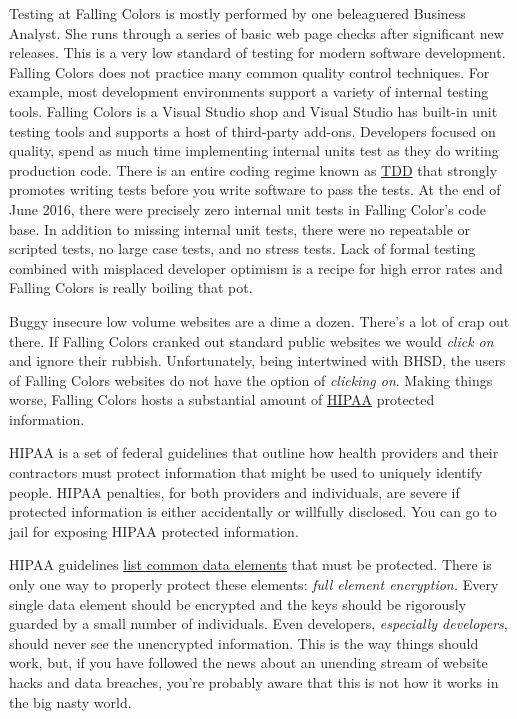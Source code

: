 Testing at Falling Colors is mostly performed by one beleaguered
Business Analyst. She runs through a series of basic web page checks
after significant new releases. This is a very low standard of testing
for modern software development. Falling Colors does not practice many
common quality control techniques. For example, most development
environments support a variety of internal testing tools. Falling Colors
is a Visual Studio shop and Visual Studio has built-in unit testing
tools and supports a host of third-party add-ons. Developers focused on
quality, spend as much time implementing internal units test as they do
writing production code. There is an entire coding regime known as
\href{http://agiledata.org/essays/tdd.html}{TDD} that strongly promotes
writing tests before you write software to pass the tests. At the end of
June 2016, there were precisely zero internal unit tests in Falling
Color's code base. In addition to missing internal unit tests, there
were no repeatable or scripted tests, no large case tests, and no stress
tests. Lack of formal testing combined with misplaced developer optimism
is a recipe for high error rates and Falling Colors is really boiling
that pot.

Buggy insecure low volume websites are a dime a dozen. There's a lot of
crap out there. If Falling Colors cranked out standard public websites
we would \emph{click on} and ignore their rubbish. Unfortunately, being
intertwined with BHSD, the users of Falling Colors websites do not have
the option of \emph{clicking on}. Making things worse, Falling Colors
hosts a substantial amount of
\href{http://www.hhs.gov/hipaa/for-professionals/privacy/}{HIPAA}
protected information.

HIPAA is a set of federal guidelines that outline how health providers
and their contractors must protect information that might be used to
uniquely identify people. HIPAA penalties, for both providers and
individuals, are severe if protected information is either accidentally
or willfully disclosed. You can go to jail for exposing HIPAA protected
information.

HIPAA guidelines
\href{https://en.wikipedia.org/wiki/Protected_health_information}{list
common data elements} that must be protected. There is only one way to
properly protect these elements: \emph{full element encryption.} Every
single data element should be encrypted and the keys should be
rigorously guarded by a small number of individuals. Even developers,
\emph{especially developers}, should never see the unencrypted
information. This is the way things should work, but, if you have
followed the news about an unending stream of website hacks and data
breaches, you're probably aware that this is not how it works in the big
nasty world.

